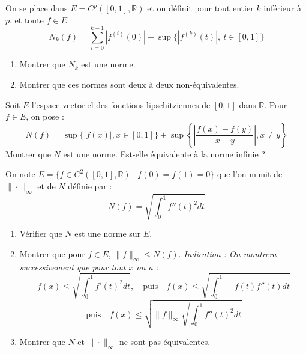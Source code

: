 \begin{exercice}
On se place dans $E = C^p([0,1], \mathbb{R})$ et on définit pour tout entier $k$ inférieur à $p$, et toute $f \in E$ :
$$ N_k(f) = \sum_{i=0}^{k-1} |f^{(i)}(0)| + \sup \{ |f^{(k)}(t)|, \ t \in [0,1] \} $$
\begin{enumerate}
    \item Montrer que $N_k$ est une norme.
    \item Montrer que ces normes sont deux à deux non-équivalentes.
\end{enumerate}
\end{exercice}

\begin{exercice}
Soit $E$ l'espace vectoriel des fonctions lipschitziennes de $[0,1]$ dans $\mathbb{R}$. Pour $f \in E$, on pose :
$$ N(f) = \sup \{ |f(x)|, x \in [0,1] \} + \sup \left\{ \left| \frac{f(x)-f(y)}{x-y} \right|, x \ne y \right\} $$
Montrer que $N$ est une norme. Est-elle équivalente à la norme infinie ?
\end{exercice}

\begin{exercice}
On note $E = \{ f \in C^2([0,1], \mathbb{R}) \mid f(0)=f(1)=0 \}$ que l'on munit de $\|\cdot\|_\infty$ et de $N$ définie par :
$$ N(f) = \sqrt{\int_0^1 f''(t)^2 dt} $$
\begin{enumerate}
    \item Vérifier que $N$ est une norme sur $E$.
    \item Montrer que pour $f \in E$, $\|f\|_\infty \le N(f)$.
    \textit{Indication : On montrera successivement que pour tout $x$ on a :}
    $$ f(x) \le \sqrt{\int_0^1 f'(t)^2 dt}, \quad \text{puis} \quad f(x) \le \sqrt{\int_0^1 -f(t)f''(t) dt} $$
    $$ \text{puis} \quad f(x) \le \sqrt{\|f\|_\infty \sqrt{\int_0^1 f''(t)^2 dt}} $$
    \item Montrer que $N$ et $\|\cdot\|_\infty$ ne sont pas équivalentes.
\end{enumerate}
\end{exercice}

